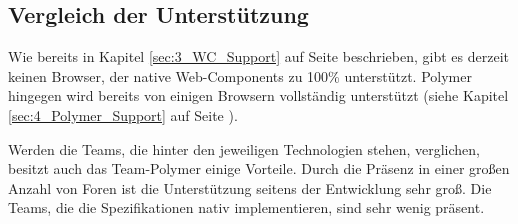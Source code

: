 \subsection{Vergleich der Unterstützung}

Wie bereits in Kapitel \ref{sec:3_WC_Support} auf Seite \pageref{sec:3_WC_Support} beschrieben, gibt es derzeit keinen Browser, der native Web-Components zu 100\% unterstützt. Polymer hingegen wird bereits von einigen Browsern vollständig unterstützt (siehe Kapitel \ref{sec:4_Polymer_Support} auf Seite \pageref{sec:4_Polymer_Support}).

Werden die Teams, die hinter den jeweiligen Technologien stehen, verglichen, besitzt auch das Team-Polymer einige Vorteile. Durch die Präsenz in einer großen Anzahl von Foren ist die Unterstützung seitens der Entwicklung sehr groß. Die Teams, die die Spezifikationen nativ implementieren, sind sehr wenig präsent.